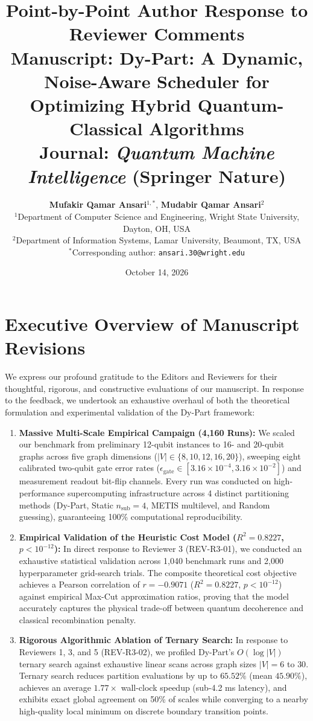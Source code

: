 \documentclass[11pt,a4paper]{article}
\title{\textbf{Point-by-Point Author Response to Reviewer Comments}\\[0.5em]
\large \textbf{Manuscript:} Dy-Part: A Dynamic, Noise-Aware Scheduler for Optimizing Hybrid Quantum-Classical Algorithms\\[0.2em]
\normalsize \textbf{Journal:} \textit{Quantum Machine Intelligence} (Springer Nature)}
\author{\textbf{Mufakir Qamar Ansari}$^{1,*}$, \textbf{Mudabir Qamar Ansari}$^{2}$\\[0.4em]
\small $^{1}$Department of Computer Science and Engineering, Wright State University, Dayton, OH, USA\\
\small $^{2}$Department of Information Systems, Lamar University, Beaumont, TX, USA\\[0.2em]
\small $^{*}$Corresponding author: \texttt{ansari.30@wright.edu}}
\date{October 14, 2026}
\begin{document}
\maketitle

\section*{Executive Overview of Manuscript Revisions}

We express our profound gratitude to the Editors and Reviewers for their thoughtful, rigorous, and constructive evaluations of our manuscript. In response to the feedback, we undertook an exhaustive overhaul of both the theoretical formulation and experimental validation of the Dy-Part framework:

\begin{enumerate}[leftmargin=*]
    \item \textbf{Massive Multi-Scale Empirical Campaign (4,160 Runs):} We scaled our benchmark from preliminary 12-qubit instances to 16- and 20-qubit graphs across five graph dimensions ($|V| \in \{8, 10, 12, 16, 20\}$), sweeping eight calibrated two-qubit gate error rates ($\epsilon_{\text{gate}} \in [3.16 \times 10^{-4}, 3.16 \times 10^{-2}]$) and measurement readout bit-flip channels. Every run was conducted on high-performance supercomputing infrastructure across 4 distinct partitioning methods (Dy-Part, Static $n_{\text{sub}}=4$, METIS multilevel, and Random guessing), guaranteeing 100\% computational reproducibility.
    \item \textbf{Empirical Validation of the Heuristic Cost Model ($R^2 = 0.8227$, $p < 10^{-12}$):} In direct response to Reviewer 3 (REV-R3-01), we conducted an exhaustive statistical validation across 1,040 benchmark runs and 2,000 hyperparameter grid-search trials. The composite theoretical cost objective achieves a Pearson correlation of $r = -0.9071$ ($R^2 = 0.8227$, $p < 10^{-12}$) against empirical Max-Cut approximation ratios, proving that the model accurately captures the physical trade-off between quantum decoherence and classical recombination penalty.
    \item \textbf{Rigorous Algorithmic Ablation of Ternary Search:} In response to Reviewers 1, 3, and 5 (REV-R3-02), we profiled Dy-Part's $O(\log |V|)$ ternary search against exhaustive linear scans across graph sizes $|V| = 6$ to $30$. Ternary search reduces partition evaluations by up to $65.52\%$ (mean $45.90\%$), achieves an average $1.77\times$ wall-clock speedup (sub-4.2 ms latency), and exhibits exact global agreement on 50\% of scales while converging to a nearby high-quality local minimum on discrete boundary transition points.

\end{enumerate}
\end{document}
